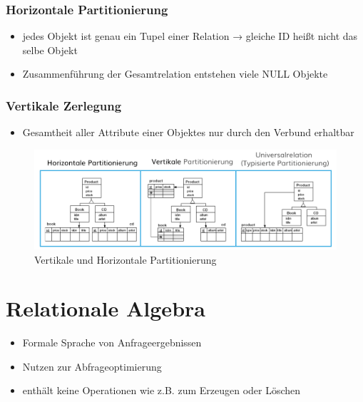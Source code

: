 \documentclass[a4paper]{article}
\begin{document}
\subsubsection{Horizontale Partitionierung}
\begin{itemize}
    \item jedes Objekt ist genau ein Tupel einer Relation → gleiche ID heißt nicht das selbe Objekt
    \item Zusammenführung der Gesamtrelation entstehen viele NULL Objekte
\end{itemize}

\subsubsection{Vertikale Zerlegung}
\begin{itemize}
    \item Gesamtheit aller Attribute einer Objektes nur durch den Verbund erhaltbar
\end{itemize}

\begin{figure}[htp]
    \centering
    \includegraphics[width=14cm]{images/Partitionierung.png}
    \caption{Vertikale und Horizontale Partitionierung}
    \label{fig:Partitionierung}
\end{figure}

\newpage

\section{Relationale Algebra}
\begin{itemize}
    \item Formale Sprache von Anfrageergebnissen
    \item Nutzen zur Abfrageoptimierung
    \item enthält keine Operationen wie z.B. zum Erzeugen oder Löschen
\end{itemize}
\end{document}
